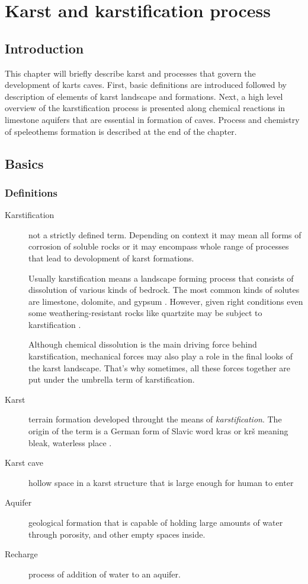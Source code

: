 \chapter{Karst and karstification process}
\section{Introduction}
This chapter will briefly describe karst and processes that govern the
development of karts caves. First, basic definitions are introduced followed by
description of elements of karst landscape and formations. Next, a high level
overview of the karstification process is presented along chemical reactions
in limestone aquifers that are essential in formation of caves. Process and
chemistry of speleothems formation is described at the end of the chapter.
\section{Basics}

\subsection{Definitions}
\begin{description}
  \item[Karstification]
    not a strictly defined term. Depending on context it may
    mean all forms of corrosion of soluble rocks or it may encompass whole range of
    processes that lead to devolopment of karst formations.
    
    Usually karstification means a landscape forming process that consists of dissolution
    of various kinds of bedrock. The most common kinds of solutes are limestone,
    dolomite, and gypsum \parencite{karstglossary}. However, given right conditions
    even some weathering-resistant rocks like quartzite may be subject to 
    karstification \parencite{migon2010}.
    
    Although chemical dissolution is the main driving force behind karstification,
    mechanical forces may also play a role in the final looks of the karst landscape.
    That's why sometimes, all these forces together are put under the umbrella term
    of karstification.

  \item[Karst]
    terrain formation developed throught the means of
    \emph{karstification}. The origin of the term is a German form of Slavic word
    kras or krš meaning bleak, waterless place \parencite{karstglossary}.
  \item[Karst cave]
    hollow space in a karst structure that is large enough for human to enter
    \parencite{hill1997cave}
  \item[Aquifer]
    geological formation that is capable of holding large amounts of water
    through porosity, and other empty spaces inside.
  \item[Recharge]
    process of addition of water to an aquifer.
\end{description}
